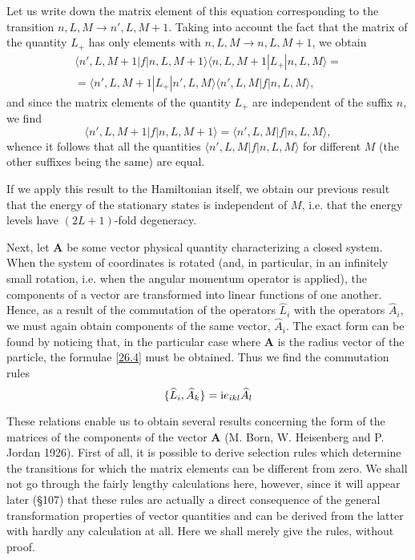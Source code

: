 Let us write down the matrix element of this equation corresponding to the transition $ n, L, M \to n', L, M + 1 $. Taking into account the fact that the matrix of the quantity $ L_+ $ has only elements with $ n, L, M \to n, L, M + 1 $, we obtain
\begin{multline*}
\langle n',L,M+1|f|n,L,M+1\rangle\langle n,L,M+1|L_+|n,L,M\rangle=\\
=\langle n',L,M+1|L_+|n',L,M\rangle\langle n',L,M|f|n,L,M\rangle,
\end{multline*}
and since the matrix elements of the quantity $ L_+ $ are independent of the suffix $ n $, we find
\begin{equation}\label{29.3}
\langle n',L,M+1|f|n,L,M+1\rangle=\langle n',L,M|f|n,L,M\rangle,
\end{equation}
whence it follows that all the quantities $ \langle n', L, M| f|n, L, M\rangle $ for different $ M $ (the other suffixes being the same) are equal.

If we apply this result to the Hamiltonian itself, we obtain our previous result that the energy of the stationary states is independent of $ M $, i.e. that the energy levels have $ (2L + 1) $-fold degeneracy.

Next, let $ \bm{A} $ be some vector physical quantity characterizing a closed system. When the system of coordinates is rotated (and, in particular, in an infinitely small rotation, i.e. when the angular momentum operator is applied), the components of a vector are transformed into linear functions of one another. Hence, as a result of the commutation of the operators $\hat{L}_i$ with the operators $\hat{A}_i$, we must again obtain components of the same vector, $\hat{A}_i$. The exact form can be found by noticing that, in the particular case where $ \bm{A} $ is the radius vector of the particle, the formulae \eqref{26.4} must be obtained. Thus we find the commutation rules
\begin{equation}\label{29.4}
\{ \widehat{L}_i,\widehat{A}_k \}=\mathrm{i} e_{ikl}\widehat{A}_l
\end{equation}


These relations enable us to obtain several results concerning the form of the matrices of the components of the vector $ \bm{A} $ (M. Born, W. Heisenberg and P. Jordan 1926). First of all, it is possible to derive selection rules which determine the transitions for which the matrix elements can be different from zero. We shall not go through the fairly lengthy calculations here, however, since it will appear later (\S107) that these rules are actually a direct consequence of the general transformation properties of vector quantities and can be derived from the latter with hardly any calculation at all. Here we shall merely give the rules, without proof.

